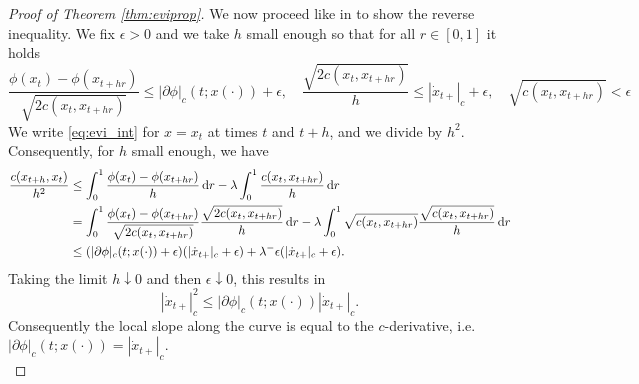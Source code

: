 \documentclass[reqno]{amsart}
\newcounter{results}[section]
\theoremstyle{plain}
\theoremstyle{remark}
\theoremstyle{plain}
\numberwithin{equation}{section}
\theoremstyle{remark}
\newcommand{\de}{{\,\rm d}}
\begin{document}
\begin{proof}[Proof of Theorem \ref{thm:eviprop}]
    We now proceed like in \cite[eq.(3.33)--(3.34)]{MuratoriSavare} to show the reverse inequality. We fix $\epsilon>0$ and we take $h$ small enough so that for all $r\in[0,1]$ it holds
    \begin{equation*}
        \frac{\phi(x_{t}) -\phi(x_{t+hr})}{\sqrt{2 c(x_{t},x_{t+hr})}} \le |\partial \phi|_c(t;x(\cdot))+\epsilon, \quad \frac{\sqrt{2 c(x_{t},x_{t+hr})}}{h} \le |\dot x_{t+ }|_c+\epsilon, \quad \sqrt{c(x_t, x_{t+hr})} <  \epsilon
    \end{equation*}
    We write \eqref{eq:evi_int} for $x=x_{t}$ at times $t$ and $t+h$, and we divide by $h^2$. Consequently, for $h$ small enough, we have
    \begin{align*}
       \frac{c(x_{t+h},x_t)}{h^2} &\le \int_0^1 \frac{\phi(x_{t}) -\phi(x_{t+hr})}{h} \de r - \lambda  \int_0^1 \frac{c(x_{t},x_{t+hr})}{h} \de r \\
       & = \int_0^1 \frac{\phi(x_{t}) -\phi(x_{t+hr})}{\sqrt{2 c(x_{t},x_{t+hr})}} \frac{\sqrt{2 c(x_{t},x_{t+hr})}}{h}\de r - \lambda  \int_0^1 \sqrt{c(x_{t},x_{t+hr})}\frac{\sqrt{c(x_{t},x_{t+hr})}}{h} \de r\\
       & \le (|\partial \phi|_c(t;x(\cdot))+\epsilon) (|\dot x_{t+ }|_c+\epsilon) + \lambda^-\epsilon (|\dot x_{t+ }|_c+\epsilon).
    \end{align*} 
    Taking the limit $h\downarrow 0$ and then $\epsilon \downarrow 0$, this results in
    \begin{equation*}
        |\dot x_{t+ }|_c^2 \le |\partial \phi|_c(t;x(\cdot)) |\dot x_{t+ }|_c.
    \end{equation*}
    Consequently the local slope along the curve is equal to the $c$-derivative, i.e.\ $|\partial \phi|_c(t;x(\cdot))=|\dot x_{t+ }|_c$.\\



\end{proof}
\end{document}
